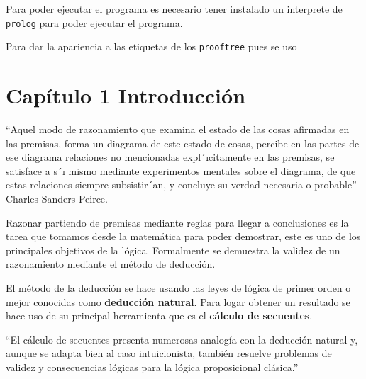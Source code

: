 \begin{Shaded}
\begin{Highlighting}[]
\end{Highlighting}
\end{Shaded}

Para poder ejecutar el programa es necesario tener instalado un
interprete de \texttt{prolog} para poder ejecutar el programa.

Para dar la apariencia a las etiquetas de los \texttt{prooftree} pues se
uso

\begin{Shaded}
\begin{Highlighting}[]
\end{Highlighting}
\end{Shaded}

\hypertarget{capuxedtulo-1-introducciuxf3n}{%
\section{Capítulo 1 Introducción}\label{capuxedtulo-1-introducciuxf3n}}

``Aquel modo de razonamiento que examina el estado de las cosas
afirmadas en las premisas, forma un diagrama de este estado de cosas,
percibe en las partes de ese diagrama relaciones no mencionadas
expl´ıcitamente en las premisas, se satisface a s´ı mismo mediante
experimentos mentales sobre el diagrama, de que estas relaciones siempre
subsistir´an, y concluye su verdad necesaria o probable'' Charles
Sanders Peirce.

Razonar partiendo de premisas mediante reglas para llegar a conclusiones
es la tarea que tomamos desde la matemática para poder demostrar, este
es uno de los principales objetivos de la lógica. Formalmente se
demuestra la validez de un razonamiento mediante el método de deducción.

El método de la deducción se hace usando las leyes de lógica de primer
orden o mejor conocidas como \textbf{deducción natural}. Para logar
obtener un resultado se hace uso de su principal herramienta que es el
\textbf{cálculo de secuentes}.

``El cálculo de secuentes presenta numerosas analogía con la deducción
natural y, aunque se adapta bien al caso intuicionista, también resuelve
problemas de validez y consecuencias lógicas para la lógica
proposicional clásica.''

